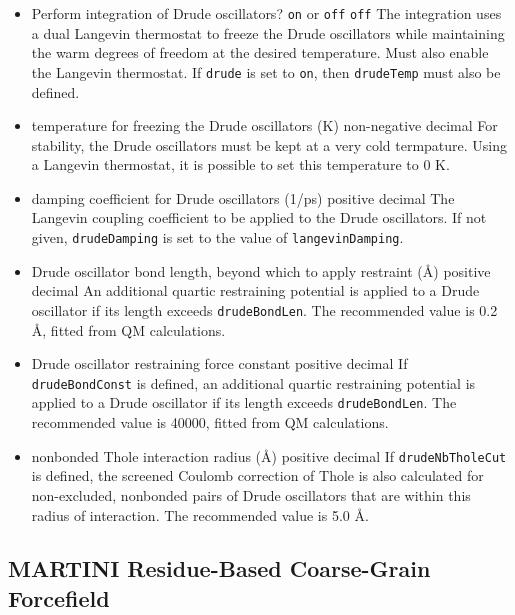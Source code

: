 \begin{itemize}

\item{}
{Perform integration of Drude oscillators?}
{{\tt on} or {\tt off}}
{{\tt off}}
{The integration uses a dual Langevin thermostat to freeze the Drude 
oscillators while maintaining the warm degrees of freedom at the
desired temperature.  Must also enable the Langevin thermostat.
If {\tt drude} is set to {\tt on}, then {\tt drudeTemp} must also be defined.}

\item{}
{temperature for freezing the Drude oscillators (K)}
{non-negative decimal}
{For stability, the Drude oscillators must be kept at a very cold termpature.
Using a Langevin thermostat, it is possible to set this temperature to 0 K.}

\item{}
{damping coefficient for Drude oscillators (1/ps)}
{positive decimal}
{The Langevin coupling coefficient to be applied to the Drude oscillators.  
If not given, {\tt drudeDamping} is set to the value of {\tt langevinDamping}.}

\item{}
{Drude oscillator bond length, beyond which to apply restraint (\AA)}
{positive decimal}
{An additional quartic restraining potential is applied to a Drude 
oscillator if its length exceeds {\tt drudeBondLen}.  
The recommended value is 0.2 \AA, fitted from QM calculations.}

\item{}
{Drude oscillator restraining force constant}
{positive decimal}
{If {\tt drudeBondConst} is defined,
an additional quartic restraining potential is applied to a Drude 
oscillator if its length exceeds {\tt drudeBondLen}.
The recommended value is 40000, fitted from QM calculations.}

\item{}
{nonbonded Thole interaction radius (\AA)}
{positive decimal}
{If {\tt drudeNbTholeCut} is defined, 
the screened Coulomb correction of Thole is also calculated
for non-excluded, nonbonded pairs of Drude oscillators that are
within this radius of interaction.
The recommended value is 5.0 \AA.}

\end{itemize}


\subsection{MARTINI Residue-Based Coarse-Grain Forcefield}

